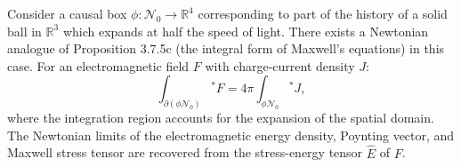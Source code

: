 Consider a causal box $\phi: \mathcal{N}_0 \to \mathbb{R}^4$ corresponding to part of the history of a solid ball in $\mathbb{R}^3$ which expands at half the speed of light. There exists a Newtonian analogue of Proposition 3.7.5c (the integral form of Maxwell's equations) in this case. For an electromagnetic field $F$ with charge-current density $J$:
$$\int_{\partial(\phi\mathcal{N}_0)} {}^*F = 4\pi \int_{\phi\mathcal{N}_0} {}^*J,$$
where the integration region accounts for the expansion of the spatial domain. The Newtonian limits of the electromagnetic energy density, Poynting vector, and Maxwell stress tensor are recovered from the stress-energy tensor $\hat{E}$ of $F$.
